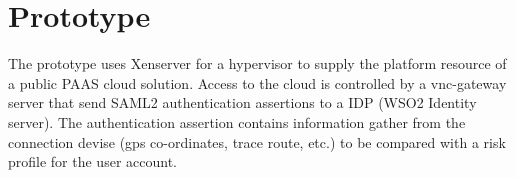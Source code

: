 \documentclass[11pt]{article}
\begin{document}
\section{Prototype}
The prototype uses Xenserver for a hypervisor to supply the platform resource of a public PAAS cloud solution. Access to the cloud is controlled by a vnc-gateway server that send SAML2 authentication assertions to a IDP (WSO2 Identity server). The authentication assertion contains information gather from the connection devise (gps co-ordinates, trace route, etc.) to be compared with a risk profile for the user account.    



\end{document}
